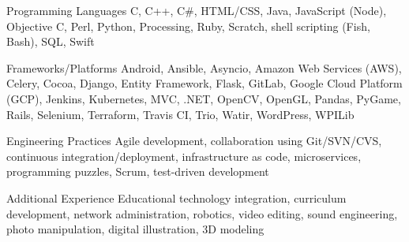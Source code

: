 


\begin{cvskills}


\cvskill
{Programming Languages} %
{C, C++, C\#, HTML/CSS, Java, JavaScript (Node), Objective C, Perl, Python, Processing, Ruby, Scratch, shell scripting (Fish, Bash), SQL, Swift} %


\cvskill
{Frameworks/Platforms} %
{Android, Ansible, Asyncio, Amazon Web Services (AWS), Celery, Cocoa, Django, Entity Framework, Flask, GitLab, Google Cloud Platform (GCP), Jenkins, Kubernetes, MVC, .NET, OpenCV, OpenGL, Pandas, PyGame, Rails, Selenium, Terraform, Travis CI, Trio, Watir, WordPress, WPILib} %


\cvskill
{Engineering Practices} %
{Agile development, collaboration using Git/SVN/CVS, continuous integration/deployment, infrastructure as code, microservices, programming puzzles, Scrum, test-driven development} %


\cvskill
{Additional Experience} %
{Educational technology integration, curriculum development, network administration, robotics, video editing, sound engineering, photo manipulation, digital illustration, 3D modeling
} %


\end{cvskills}